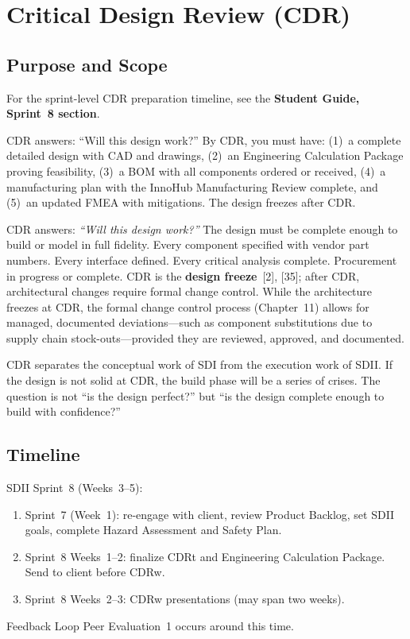 \chapter{Critical Design Review (CDR)}

\section{Purpose and Scope}

\begin{tipbox}
For the sprint-level CDR preparation timeline, see the \textbf{Student Guide, Sprint~8 section}.
\end{tipbox}


\begin{keyconceptbox}
CDR answers: ``Will this design work?'' By CDR, you must have: (1)~a complete detailed design with CAD and drawings, (2)~an Engineering Calculation Package proving feasibility, (3)~a BOM with all components ordered or received, (4)~a manufacturing plan with the InnoHub Manufacturing Review complete, and (5)~an updated FMEA with mitigations. The design freezes after CDR.
\end{keyconceptbox}

CDR answers: \emph{``Will this design work?''} The design must be complete enough to build or model in full fidelity. Every component specified with vendor part numbers. Every interface defined. Every critical analysis complete. Procurement in progress or complete. CDR is the \textbf{design freeze}~[2], [35]; after CDR, architectural changes require formal change control. While the architecture freezes at CDR, the formal change control process (Chapter~11) allows for managed, documented deviations---such as component substitutions due to supply chain stock-outs---provided they are reviewed, approved, and documented.

CDR separates the conceptual work of SDI from the execution work of SDII. If the design is not solid at CDR, the build phase will be a series of crises. The question is not ``is the design perfect?'' but ``is the design complete enough to build with confidence?''

\section{Timeline}
SDII Sprint~8 (Weeks~3--5):
\begin{enumerate}[nosep,leftmargin=1.5em]
\item Sprint~7 (Week~1): re-engage with client, review Product Backlog, set SDII goals, complete Hazard Assessment and Safety Plan.
\item Sprint~8 Weeks~1--2: finalize CDRt and Engineering Calculation Package. Send to client before CDRw.
\item Sprint~8 Weeks~2--3: CDRw presentations (may span two weeks).
\end{enumerate}
Feedback Loop Peer Evaluation~1 occurs around this time.

